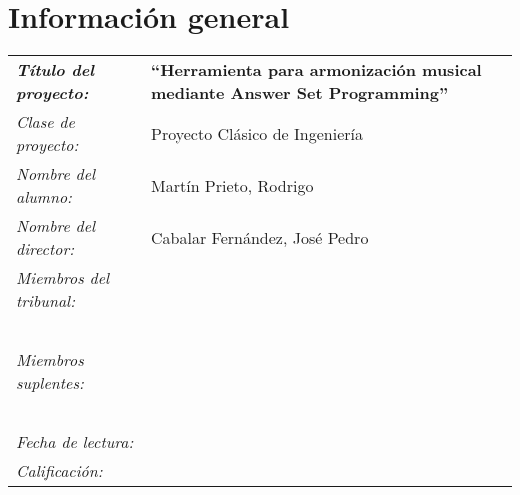 \thispagestyle{empty}
\section*{Información general}
\vfill
\begin{center}
\begin{tabular}{p{4.5cm}p{9cm}}
\textbf{\emph{Título del proyecto:}} & \textbf{``Herramienta para armonización musical mediante Answer Set Programming''} \\[0.5cm]
\emph{Clase de proyecto:} & Proyecto Clásico de Ingeniería \\[0.5cm]
\emph{Nombre del alumno:} & Martín Prieto, Rodrigo \\[0.5cm]
\emph{Nombre del director:} & Cabalar Fernández, José Pedro \\[0.5cm]
\emph{Miembros del tribunal:} & \\[0.5cm]
& \\
& \\
& \\
& \\
& \\
\emph{Miembros suplentes:} & \\[0.5cm]
& \\
& \\
& \\
& \\
& \\
\emph{Fecha de lectura:} & \\[0.5cm]
\emph{Calificación:} & \\
\end{tabular}
\end{center}
\vfill
